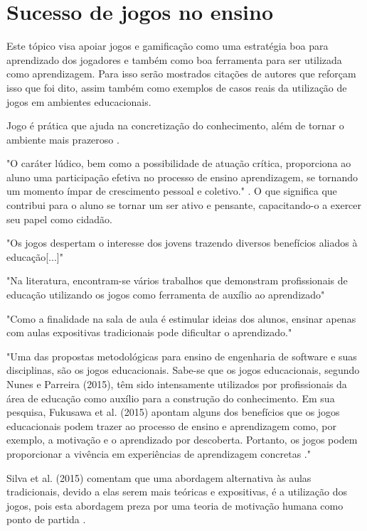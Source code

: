 
\section[Sucesso de jogos no ensino]{Sucesso de jogos no ensino}

Este tópico visa apoiar jogos e gamificação como uma estratégia boa para aprendizado dos jogadores e também como boa ferramenta para ser utilizada como aprendizagem. Para isso serão mostrados citações de autores que reforçam isso que foi dito, assim também como exemplos de casos reais da utilização de jogos em ambientes educacionais. 

Jogo é prática que ajuda na concretização do conhecimento, além de tornar o ambiente mais prazeroso \cite{jogoPratPedagoc}. 

"O caráter lúdico, bem como a possibilidade de atuação crítica, proporciona ao aluno uma participação efetiva no processo de ensino aprendizagem, se tornando um momento ímpar de crescimento pessoal e coletivo."  \cite{jogoPratPedagoc}. O que significa que contribui para o aluno se tornar um ser ativo e pensante, capacitando-o a exercer seu papel como cidadão.

"Os jogos despertam o interesse dos jovens trazendo diversos benefícios aliados à educação[...]" \cite{appcalculo}

"Na literatura, encontram-se vários trabalhos que demonstram profissionais de educação utilizando os jogos como ferramenta de auxílio ao aprendizado" \cite[p. 3]{sucessoJogoEngSoft}

"Como a finalidade na sala de aula é estimular ideias dos alunos, ensinar apenas com aulas expositivas
tradicionais pode dificultar o aprendizado." \cite[p. 4]{sucessoJogoEngSoft} 

"Uma das propostas metodológicas para ensino de engenharia de software e suas disciplinas, são os jogos educacionais. Sabe-se que os jogos educacionais, segundo Nunes e Parreira (2015), têm sido intensamente utilizados por profissionais da área de educação como auxílio para a construção do conhecimento. Em sua pesquisa, Fukusawa et al. (2015) apontam alguns dos benefícios que os jogos educacionais podem trazer ao
processo de ensino e aprendizagem como, por exemplo, a motivação e o aprendizado por descoberta. Portanto, os jogos podem proporcionar a vivência em experiências de aprendizagem concretas ."

Silva et al. (2015) comentam que uma abordagem alternativa às aulas tradicionais, devido  a elas serem mais teóricas e expositivas, é a utilização dos jogos, pois esta abordagem preza por uma teoria de motivação humana como ponto de partida \cite{sucessoJogoEngSoft}.

